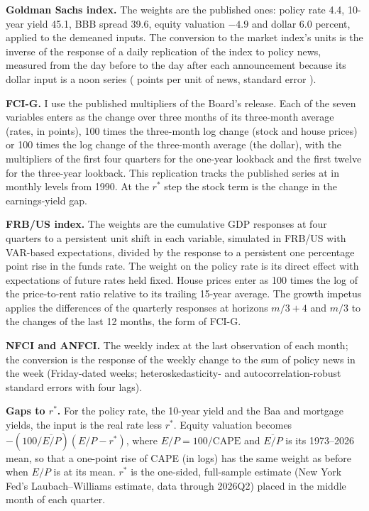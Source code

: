\documentclass[11pt]{article}
\newcommand{\rs}{r^{*}}
\begin{document}
\begin{appendices}
\textbf{Goldman Sachs index.} The weights are the published ones: policy rate 4.4, 10-year yield 45.1, BBB spread 39.6, equity valuation $-4.9$ and dollar 6.0 percent, applied to the demeaned inputs. The conversion to the market index's units is the inverse of the response of a daily replication of the index to policy news, measured from the day before to the day after each announcement because its dollar input is a noon series ( points per unit of news, standard error ).

\textbf{FCI-G.} I use the published multipliers of the Board's release. Each of the seven variables enters as the change over three months of its three-month average (rates, in points), 100 times the three-month log change (stock and house prices) or 100 times the log change of the three-month average (the dollar), with the multipliers of the first four quarters for the one-year lookback and the first twelve for the three-year lookback. This replication tracks the published series at  in monthly levels from 1990. At the $\rs$ step the stock term is the change in the earnings-yield gap.

\textbf{FRB/US index.} The weights are the cumulative GDP responses at four quarters to a persistent unit shift in each variable, simulated in FRB/US with VAR-based expectations, divided by the response to a persistent one percentage point rise in the funds rate. The weight on the policy rate is its direct effect with expectations of future rates held fixed. House prices enter as 100 times the log of the price-to-rent ratio relative to its trailing 15-year average. The growth impetus applies the differences of the quarterly responses at horizons $m/3+4$ and $m/3$ to the changes of the last 12 months, the form of FCI-G.

\textbf{NFCI and ANFCI.} The weekly index at the last observation of each month; the conversion is the response of the weekly change to the sum of policy news in the week (Friday-dated weeks; heteroskedasticity- and autocorrelation-robust standard errors with four lags).

\textbf{Gaps to $\rs$.} For the policy rate, the 10-year yield and the Baa and mortgage yields, the input is the real rate less $\rs$. Equity valuation becomes $-(100/\overline{E/P})(E/P-\rs)$, where $E/P=100/\text{CAPE}$ and $\overline{E/P}$ is its 1973--2026 mean, so that a one-point rise of CAPE (in logs) has the same weight as before when $E/P$ is at its mean. $\rs$ is the one-sided, full-sample estimate (New York Fed's Laubach--Williams estimate, data through 2026Q2) placed in the middle month of each quarter.


\end{appendices}
\end{document}
